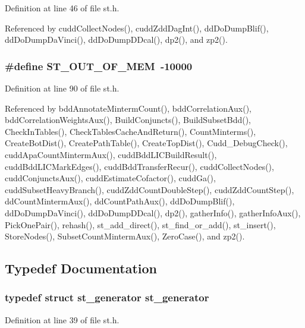 Definition at line 46 of file st.h.

Referenced by cudd\-Collect\-Nodes(), cudd\-Zdd\-Dag\-Int(), dd\-Do\-Dump\-Blif(), dd\-Do\-Dump\-Da\-Vinci(), dd\-Do\-Dump\-DDcal(), dp2(), and zp2().
\subsubsection{\setlength{\rightskip}{0pt plus 5cm}\#define ST\_\-OUT\_\-OF\_\-MEM~-10000}\label{st_8h_1276d6ae80c20ae2ec082db7c502ef75}




Definition at line 90 of file st.h.

Referenced by bdd\-Annotate\-Minterm\-Count(), bdd\-Correlation\-Aux(), bdd\-Correlation\-Weights\-Aux(), Build\-Conjuncts(), Build\-Subset\-Bdd(), Check\-In\-Tables(), Check\-Tables\-Cache\-And\-Return(), Count\-Minterms(), Create\-Bot\-Dist(), Create\-Path\-Table(), Create\-Top\-Dist(), Cudd\_\-Debug\-Check(), cudd\-Apa\-Count\-Minterm\-Aux(), cudd\-Bdd\-LICBuild\-Result(), cudd\-Bdd\-LICMark\-Edges(), cudd\-Bdd\-Transfer\-Recur(), cudd\-Collect\-Nodes(), cudd\-Conjuncts\-Aux(), cudd\-Estimate\-Cofactor(), cudd\-Ga(), cudd\-Subset\-Heavy\-Branch(), cudd\-Zdd\-Count\-Double\-Step(), cudd\-Zdd\-Count\-Step(), dd\-Count\-Minterm\-Aux(), dd\-Count\-Path\-Aux(), dd\-Do\-Dump\-Blif(), dd\-Do\-Dump\-Da\-Vinci(), dd\-Do\-Dump\-DDcal(), dp2(), gather\-Info(), gather\-Info\-Aux(), Pick\-One\-Pair(), rehash(), st\_\-add\_\-direct(), st\_\-find\_\-or\_\-add(), st\_\-insert(), Store\-Nodes(), Subset\-Count\-Minterm\-Aux(), Zero\-Case(), and zp2().

\subsection{Typedef Documentation}
\subsubsection{\setlength{\rightskip}{0pt plus 5cm}typedef struct \bf{st\_\-generator} \bf{st\_\-generator}}\label{st_8h_9247f69aea004a8ea6a07cd22bdae32d}




Definition at line 39 of file st.h.
